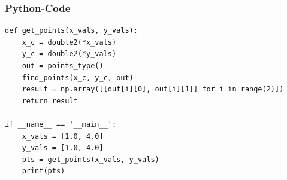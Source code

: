 \documentclass{beamer}
\begin{document}
\begin{frame}[fragile]
\frametitle{Python-Code}
\begin{lstlisting}
def get_points(x_vals, y_vals):
    x_c = double2(*x_vals)
    y_c = double2(*y_vals)
    out = points_type()
    find_points(x_c, y_c, out)
    result = np.array([[out[i][0], out[i][1]] for i in range(2)])
    return result

if __name__ == '__main__':
    x_vals = [1.0, 4.0]
    y_vals = [1.0, 4.0]
    pts = get_points(x_vals, y_vals)
    print(pts)
\end{lstlisting}
\end{frame}
\end{document}
